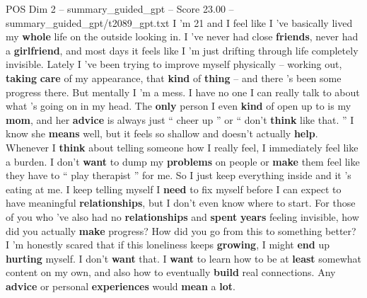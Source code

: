 \begin{textsample}{POS Dim 2 – summary\_guided\_gpt – Score 23.00 – summary\_guided\_gpt/t2089\_gpt.txt}  \label{ex:f2_pos_015}
I ’m 21 and I feel like I ’ve basically lived my \textbf{whole} life on the outside looking in.
I ’ve never had close \textbf{friends}, never had a \textbf{girlfriend}, and most days it feels like I ’m just drifting through life completely invisible.
Lately I ’ve been trying to improve myself physically – working out, \textbf{taking} \textbf{care} of my appearance, that \textbf{kind} of \textbf{thing} – and there ’s been some progress there.
But mentally I ’m a mess.
I have no one I can really talk to about what ’s going on in my head.
The \textbf{only} person I even \textbf{kind} of open up to is my \textbf{mom}, and her \textbf{advice} is always just “ cheer up ” or “ don't \textbf{think} like that. ” I know she \textbf{means} well, but it feels so shallow and doesn't actually \textbf{help}.
Whenever I \textbf{think} about telling someone how I really feel, I immediately feel like a burden.
I don't \textbf{want} to dump my \textbf{problems} on people or \textbf{make} them feel like they have to “ play therapist ” for me.
So I just keep everything inside and it ’s eating at me.
I keep telling myself I \textbf{need} to fix myself before I can expect to have meaningful \textbf{relationships}, but I don't even know where to start.
For those of you who ’ve also had no \textbf{relationships} and \textbf{spent} \textbf{years} feeling invisible, how did you actually \textbf{make} progress?
How did you go from this to something better?
I ’m honestly scared that if this loneliness keeps \textbf{growing}, I might \textbf{end} up \textbf{hurting} myself.
I don't \textbf{want} that.
I \textbf{want} to learn how to be at \textbf{least} somewhat content on my own, and also how to eventually \textbf{build} real connections.
Any \textbf{advice} or personal \textbf{experiences} would \textbf{mean} a \textbf{lot}.

\end{textsample}
